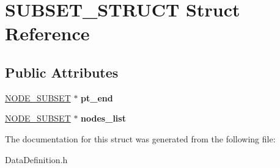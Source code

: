 \hypertarget{structSUBSET__STRUCT}{\section{S\-U\-B\-S\-E\-T\-\_\-\-S\-T\-R\-U\-C\-T Struct Reference}
\label{structSUBSET__STRUCT}
}
\subsection*{Public Attributes}
\begin{DoxyCompactItemize}
\item 
\hypertarget{structSUBSET__STRUCT_a8023cbde4ffe195b6fa3fd9a7c3211f6}{\hyperlink{structNODE__SUBSET__STRUCT}{N\-O\-D\-E\-\_\-\-S\-U\-B\-S\-E\-T} $\ast$ {\bfseries pt\-\_\-end}}\label{structSUBSET__STRUCT_a8023cbde4ffe195b6fa3fd9a7c3211f6}

\item 
\hypertarget{structSUBSET__STRUCT_a61f3350ae28b746fea56129536e73ec1}{\hyperlink{structNODE__SUBSET__STRUCT}{N\-O\-D\-E\-\_\-\-S\-U\-B\-S\-E\-T} $\ast$ {\bfseries nodes\-\_\-list}}\label{structSUBSET__STRUCT_a61f3350ae28b746fea56129536e73ec1}

\end{DoxyCompactItemize}


The documentation for this struct was generated from the following file\-:\begin{DoxyCompactItemize}
\item 
Data\-Definition.\-h\end{DoxyCompactItemize}
